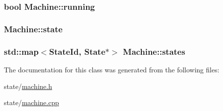 \subsubsection[{\texorpdfstring{running}{running}}]{\setlength{\rightskip}{0pt plus 5cm}bool Machine\+::running\hspace{0.3cm}{\ttfamily [protected]}}\hypertarget{classMachine_aaf4949e30c3e33602e4082c9739d3e37}{}\label{classMachine_aaf4949e30c3e33602e4082c9739d3e37}
\subsubsection[{\texorpdfstring{state}{state}}]{ Machine\+::state\hspace{0.3cm}{\ttfamily [protected]}}\hypertarget{classMachine_a76e105e6a1e86eb11af49ca4c9a9ead9}{}\label{classMachine_a76e105e6a1e86eb11af49ca4c9a9ead9}
\subsubsection[{\texorpdfstring{states}{states}}]{\setlength{\rightskip}{0pt plus 5cm}std\+::map$<${\bf State\+Id}, {\bf State}$\ast$$>$ Machine\+::states\hspace{0.3cm}{\ttfamily [protected]}}\hypertarget{classMachine_ab6245c4e251df9deaff8b6fa99f7a6e5}{}\label{classMachine_ab6245c4e251df9deaff8b6fa99f7a6e5}


The documentation for this class was generated from the following files\+:\begin{DoxyCompactItemize}
\item 
state/\hyperlink{machine_8h}{machine.\+h}\item 
state/\hyperlink{machine_8cpp}{machine.\+cpp}\end{DoxyCompactItemize}
